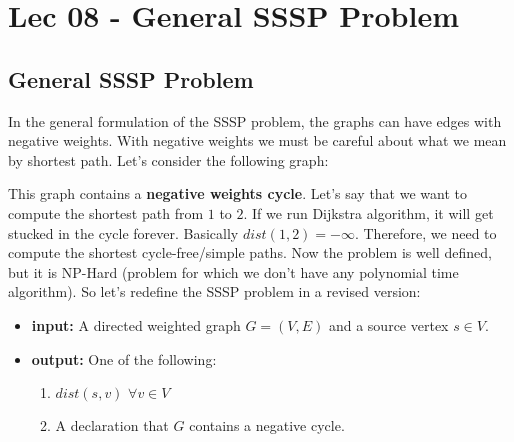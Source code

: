 \chapter{Lec 08 - General SSSP Problem}

\section{General SSSP Problem}
In the general formulation of the SSSP problem, the graphs can have edges with negative weights. With negative weights we must be careful about what we mean by shortest path. Let's consider the following graph:

\newline\newline
This graph contains a \textbf{negative weights cycle}. Let's say that we want to compute the shortest path from $1$ to $2$. If we run Dijkstra algorithm, it will get stucked in the cycle forever. Basically $dist(1, 2) = -\infty$.\newline\newline
Therefore, we need to compute the shortest cycle-free/simple paths. Now the problem is well defined, but it is NP-Hard (problem for which we don't have any polynomial time algorithm).\newline\newline
So let's redefine the SSSP problem in a revised version:
\begin{itemize}
    \item \textbf{input:} A directed weighted graph $G = (V, E)$ and a source vertex $s \in V$.

    \item \textbf{output:} One of the following:
    \begin{enumerate}
        \item $dist(s, v) \,\, \forall v \in V$

        \item A declaration that $G$ contains a negative cycle.
    \end{enumerate}
\end{itemize}
